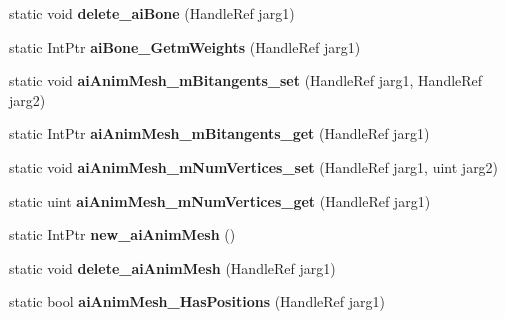 \begin{DoxyCompactItemize}
\item 
\hypertarget{class_assimp_p_i_n_v_o_k_e_a6039d544ed49d8f1dbf5988a55610d9d}{static void {\bfseries delete\+\_\+ai\+Bone} (Handle\+Ref jarg1)}\label{class_assimp_p_i_n_v_o_k_e_a6039d544ed49d8f1dbf5988a55610d9d}

\item 
\hypertarget{class_assimp_p_i_n_v_o_k_e_a7d26a7f6d37d43d6557f3d9c633dc509}{static Int\+Ptr {\bfseries ai\+Bone\+\_\+\+Getm\+Weights} (Handle\+Ref jarg1)}\label{class_assimp_p_i_n_v_o_k_e_a7d26a7f6d37d43d6557f3d9c633dc509}

\item 
\hypertarget{class_assimp_p_i_n_v_o_k_e_a2e499983c25bd960105490cb447e3fae}{static void {\bfseries ai\+Anim\+Mesh\+\_\+m\+Bitangents\+\_\+set} (Handle\+Ref jarg1, Handle\+Ref jarg2)}\label{class_assimp_p_i_n_v_o_k_e_a2e499983c25bd960105490cb447e3fae}

\item 
\hypertarget{class_assimp_p_i_n_v_o_k_e_ac15df6a06f5e497467c211232bbd26fb}{static Int\+Ptr {\bfseries ai\+Anim\+Mesh\+\_\+m\+Bitangents\+\_\+get} (Handle\+Ref jarg1)}\label{class_assimp_p_i_n_v_o_k_e_ac15df6a06f5e497467c211232bbd26fb}

\item 
\hypertarget{class_assimp_p_i_n_v_o_k_e_a6cb5e9bb13ee8f8c7d207d9adefc7d35}{static void {\bfseries ai\+Anim\+Mesh\+\_\+m\+Num\+Vertices\+\_\+set} (Handle\+Ref jarg1, uint jarg2)}\label{class_assimp_p_i_n_v_o_k_e_a6cb5e9bb13ee8f8c7d207d9adefc7d35}

\item 
\hypertarget{class_assimp_p_i_n_v_o_k_e_a9c477a524edc30807dc568b3ed10c824}{static uint {\bfseries ai\+Anim\+Mesh\+\_\+m\+Num\+Vertices\+\_\+get} (Handle\+Ref jarg1)}\label{class_assimp_p_i_n_v_o_k_e_a9c477a524edc30807dc568b3ed10c824}

\item 
\hypertarget{class_assimp_p_i_n_v_o_k_e_a6ca550616d685dd9500d004e54cda109}{static Int\+Ptr {\bfseries new\+\_\+ai\+Anim\+Mesh} ()}\label{class_assimp_p_i_n_v_o_k_e_a6ca550616d685dd9500d004e54cda109}

\item 
\hypertarget{class_assimp_p_i_n_v_o_k_e_ad65e940e5b57211f2b0f3ad64fbca0a3}{static void {\bfseries delete\+\_\+ai\+Anim\+Mesh} (Handle\+Ref jarg1)}\label{class_assimp_p_i_n_v_o_k_e_ad65e940e5b57211f2b0f3ad64fbca0a3}

\item 
\hypertarget{class_assimp_p_i_n_v_o_k_e_ab975dbcb3a5c882cfdfdb3617a64e012}{static bool {\bfseries ai\+Anim\+Mesh\+\_\+\+Has\+Positions} (Handle\+Ref jarg1)}\label{class_assimp_p_i_n_v_o_k_e_ab975dbcb3a5c882cfdfdb3617a64e012}


\end{DoxyCompactItemize}
